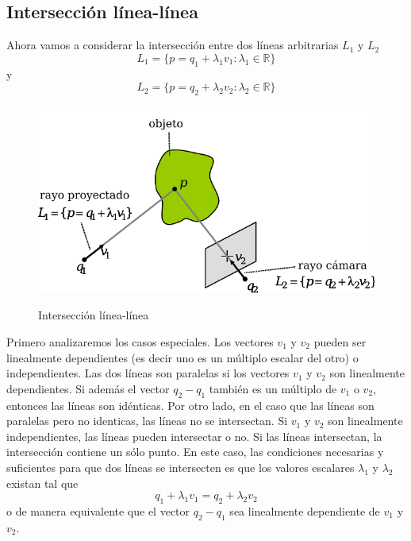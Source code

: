 
\subsection{Intersección línea-línea}
Ahora vamos a considerar la intersección entre dos líneas arbitrarias $L_1$ y $L_2$
    \[ L_1 = \{ p=q_1 + \lambda_1 v_1 : \lambda_1 \in \mathbb{R}  \} \]
y
    \[ L_2 = \{ p=q_2 + \lambda_2 v_2 : \lambda_2 \in \mathbb{R}  \} \]

\begin{figure}[bth]
    \myfloatalign
        {\includegraphics[width=0.9\linewidth]{images/intersectionLineLine}}
        \caption{Intersección línea-línea}
        \label{fig:intersecionLineLine}
\end{figure}

Primero analizaremos los casos especiales. Los vectores $v_1$ y $v_2$ pueden ser linealmente dependientes (es decir uno es un múltiplo escalar del otro) o independientes. 
Las dos líneas son paralelas si los vectores $v_1$ y $v_2$ son linealmente dependientes. Si además el vector $q_2 - q_1$ también es un múltiplo de $v_1$ o $v_2$, entonces las líneas son idénticas. Por otro lado, en el caso que las líneas son paralelas pero no identicas, las líneas no se intersectan.
Si $v_1$ y $v_2$ son linealmente independientes, las líneas pueden intersectar o no. Si las líneas intersectan, la intersección contiene un sólo punto. En este caso, las condiciones necesarias y suficientes para que dos líneas se intersecten es que los valores escalares $\lambda_1$ y $\lambda_2$ existan tal que
    \[ q_1 + \lambda_1 v_1 = q_2 + \lambda_2 v_2 \]
o de manera equivalente que el vector $q_2 - q_1$ sea linealmente dependiente de $v_1$ y $v_2$.

